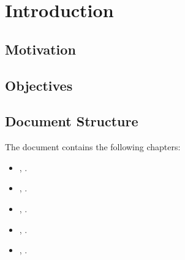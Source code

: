 \chapter{Introduction}\label{chap:introduction}

\section{Motivation}\label{sec:motivation}



\section{Objectives}\label{sec:objectives}

\section{Document Structure}\label{sec:structure}
The document contains the following chapters:
\begin{itemize}
  \item {}, .
  \item {}, .
  \item {}, .
  \item {}, .
  \item {}, .
\end{itemize}